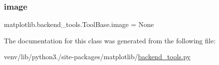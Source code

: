 \subsubsection{\texorpdfstring{image}{image}}
{\footnotesize\ttfamily matplotlib.\+backend\+\_\+tools.\+Tool\+Base.\+image = None\hspace{0.3cm}{\ttfamily [static]}}



The documentation for this class was generated from the following file\+:\begin{DoxyCompactItemize}
\item 
venv/lib/python3./site-\/packages/matplotlib/\hyperlink{backend__tools_8py}{backend\+\_\+tools.\+py}\end{DoxyCompactItemize}
